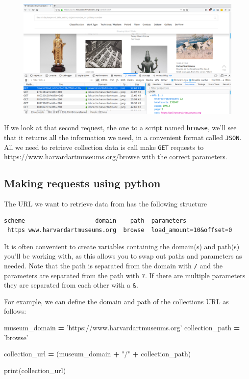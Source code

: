 \documentclass[]{book}
\newenvironment{Shaded}{\begin{snugshade}}{\end{snugshade}}
\newcommand{\StringTok}[1]{\textcolor[rgb]{0.31,0.60,0.02}{#1}}
\newcommand{\OperatorTok}[1]{\textcolor[rgb]{0.81,0.36,0.00}{\textbf{#1}}}
\newcommand{\BuiltInTok}[1]{#1}
\newcommand{\NormalTok}[1]{#1}
\begin{document}
\begin{figure}
\centering
\includegraphics{Python/PythonWebScrape/images/dev_tools_network.png}
\caption{}
\end{figure}

If we look at that second request, the one to a script named
\texttt{browse}, we'll see that it returns all the information we need,
in a convenient format called \texttt{JSON}. All we need to retrieve
collection data is call make \texttt{GET} requests to
\url{https://www.harvardartmuseums.org/browse} with the correct
parameters.

\subsection{Making requests using
python}\label{making-requests-using-python}

The URL we want to retrieve data from has the following structure

\begin{verbatim}
scheme                    domain    path  parameters
 https www.harvardartmuseums.org  browse  load_amount=10&offset=0
\end{verbatim}

It is often convenient to create variables containing the domain(s) and
path(s) you'll be working with, as this allows you to swap out paths and
parameters as needed. Note that the path is separated from the domain
with \texttt{/} and the parameters are separated from the path with
\texttt{?}. If there are multiple parameters they are separated from
each other with a \texttt{\&}.

For example, we can define the domain and path of the collections URL as
follows:

\begin{Shaded}
\begin{Highlighting}[]
\NormalTok{museum_domain }\OperatorTok{=} \StringTok{'https://www.harvardartmuseums.org'}
\NormalTok{collection_path }\OperatorTok{=} \StringTok{'browse'}

\NormalTok{collection_url }\OperatorTok{=}\NormalTok{ (museum_domain}
                  \OperatorTok{+} \StringTok{"/"}
                  \OperatorTok{+}\NormalTok{ collection_path)}

\BuiltInTok{print}\NormalTok{(collection_url)}
\end{Highlighting}
\end{Shaded}
\end{document}
